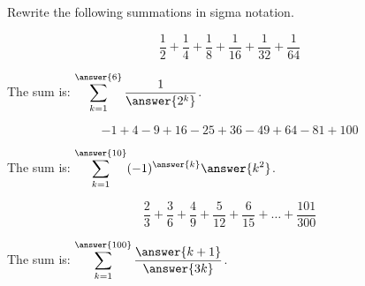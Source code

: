 \documentclass{ximera}
\author{Bobby Ramsey}
\begin{document}
Rewrite the following summations in sigma notation.
\begin{exercise}
	\[\frac{1}{2} + \frac{1}{4} + \frac{1}{8} + \frac{1}{16} + \frac{1}{32} + \frac{1}{64} \]

	The sum is: $\displaystyle \sum_{k=1}^{\answer{6}} \frac{1}{\answer{2^k}}$.
\end{exercise}

\begin{exercise}
	\[-1 + 4 - 9 + 16 - 25 + 36 - 49 + 64 - 81 + 100 \]

	The sum is: $\displaystyle \sum_{k=1}^{\answer{10}} (-1)^{\answer{k}} \answer{k^2}$.
\end{exercise}

\begin{exercise}
	\[\frac{2}{3} + \frac{3}{6} + \frac{4}{9} + \frac{5}{12} + \frac{6}{15} + \ldots + \frac{101}{300} \]

	The sum is: $\displaystyle \sum_{k=1}^{\answer{100}} \frac{\answer{k+1}}{\answer{3k}}$.
\end{exercise}
\end{document}
